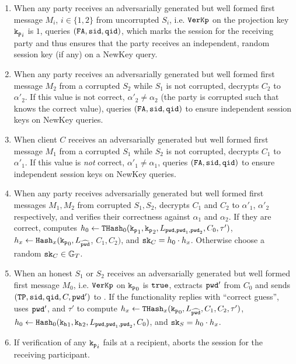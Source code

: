 \begin{enumerate}
  \item When any party receives an adversarially generated but well formed first message $M_i$, $i\in\{1,2\}$ from uncorrupted $S_i$, i.e. $\mathtt{VerKp}$ on the projection key $\mathtt{k_p}_i$ is $1$, \SIM queries $(\mathtt{FA}, \mathtt{sid}, \mathtt{qid})$, which marks the session \failed for the receiving party and thus ensures that the party receives an independent, random session key (if any) on a NewKey query.
        
  \item When any party receives an adversarially generated but well formed first message $M_2$ from a corrupted $S_2$ while $S_1$ is not corrupted, \SIM decrypts $C_2$ to $\alpha'_2$.
        If this value is not correct, $\alpha'_2\not=\alpha_2$ (the party is corrupted such that \SIM knows the correct value), \SIM queries $(\mathtt{FA}, \mathtt{sid}, \mathtt{qid})$ to ensure independent session keys on NewKey queries.    
        
  \item When client $C$ receives an adversarially generated but well formed first message $M_1$ from a corrupted $S_1$ while $S_2$ is not corrupted, \SIM decrypts $C_1$ to $\alpha'_1$.
        If this value is \emph{not} correct, $\alpha'_1\not=\alpha_1$, \SIM queries $(\mathtt{FA}, \mathtt{sid}, \mathtt{qid})$ to ensure independent session keys on NewKey queries.    
        
  \item When any party receives adversarially generated but well formed first messages $M_1, M_2$ from corrupted $S_1, S_2$, \SIM decrypts $C_1$ and $C_2$ to $\alpha'_1$, $\alpha'_2$ respectively, and verifies their correctness against $\alpha_1$ and $\alpha_2$.
        If they are correct, \SIM computes $h_0\gets\mathtt{THash}_0(\mathtt{k_p}_1, \mathtt{k_p}_2,  L_{\mathtt{pwd}, \mathtt{pwd}_1, \mathtt{pwd}_2}, C_0, \tau')$, $h_x\gets\mathtt{Hash}_x(\mathtt{k_p}_0, L_{\widehat{\mathtt{pwd}}}$, $C_1, C_2)$, and $\mathtt{sk}_C=h_0\cdot h_x$.
        Otherwise choose a random $\mathtt{sk}_C\in\mathbb{G}_T$.
         
  \item When an honest $S_1$ or $S_2$ receives an adversarially generated but well formed first message $M_0$, i.e. $\mathtt{VerKp}$ on $\mathtt{k_p}_0$ is $\mathtt{true}$, \SIM extracts $\mathtt{pwd}'$ from $C_0$ and sends $(\mathtt{TP}, \mathtt{sid}, \mathtt{qid}, C, \mathtt{pwd}')$ to \FTWOPAKE.
        If the functionality replies with ``correct guess'', \SIM uses $\mathtt{pwd}'$, \crs and $\tau'$ to compute $h_x\gets\mathtt{THash}_x(\mathtt{k_p}_0, L_{\widehat{\mathtt{pwd}}}, C_1, C_2, \tau')$, $h_0\gets\mathtt{Hash}_0(\mathtt{k_h}_1, \mathtt{k_h}_2, L_{\mathtt{pwd}, \mathtt{pwd}_1, \mathtt{pwd}_2}, C_0)$, and $\mathtt{sk}_S=h_0\cdot h_x$.
        
  \item If verification of any $\mathtt{k_p}_i$ fails at a recipient, \SIM aborts the session for the receiving participant.
\end{enumerate}  


